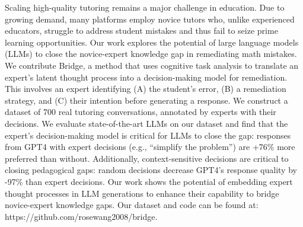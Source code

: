 Scaling high-quality tutoring remains a major challenge in education. Due to growing demand, many platforms employ novice tutors who, unlike experienced educators, struggle to address student mistakes and thus fail to seize prime learning opportunities. Our work explores the potential of large language models (LLMs) to close the novice-expert knowledge gap in remediating math mistakes. We contribute Bridge, a method that uses cognitive task analysis to translate an expert's latent thought process into a decision-making model for remediation. This involves an expert identifying (A) the student's error, (B) a remediation strategy, and (C) their intention before generating a response. We construct a dataset of 700 real tutoring conversations, annotated by experts with their decisions. We evaluate state-of-the-art LLMs on our dataset and find that the expert's decision-making model is critical for LLMs to close the gap: responses from GPT4 with expert decisions (e.g., ``simplify the problem'') are +76\% more preferred than without. Additionally, context-sensitive decisions are critical to closing pedagogical gaps: random decisions decrease GPT4's response quality by -97\% than expert decisions. Our work shows the potential of embedding expert thought processes in LLM generations to enhance their capability to bridge novice-expert knowledge gaps. Our dataset and code can be found at: https://github.com/rosewang2008/bridge.